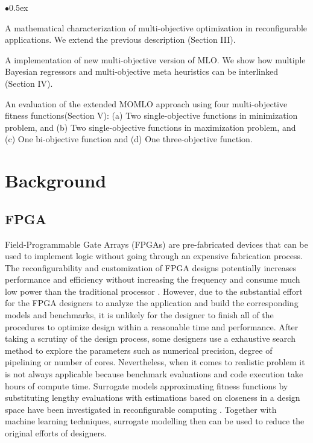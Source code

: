 \documentclass[11pt, runningheads,a4paper]{llncs}
\begin{document}
\vspace{-0.5em}

\begin{list}{$\bullet$}{\itemsep 0.5ex}

\item A mathematical characterization of multi-objective optimization in reconfigurable applications. We extend the previous description \cite{arc2012MLO} (Section III).

\item A implementation of new multi-objective version of MLO. We show how multiple Bayesian regressors and multi-objective meta heuristics can be interlinked (Section IV).

\item An evaluation of the extended MOMLO approach using four multi-objective fitness functions(Section V): (a) Two single-objective functions in minimization problem, and (b) Two single-objective functions in maximization problem, and (c) One bi-objective function  and (d) One three-objective function.
\end{list}




\section{Background}
\subsection{FPGA}
 Field-Programmable Gate Arrays (FPGAs) are pre-fabricated devices that can be used to implement logic without going through an expensive fabrication process. The reconfigurability and customization of FPGA designs potentially increases performance and efficiency without increasing the frequency and consume much low power than the traditional processor \cite{arc2012MLO}. However, due to the substantial effort for the FPGA designers to analyze the application and build the corresponding models and benchmarks, it is unlikely for the designer to finish all of the procedures to optimize design within a reasonable time and performance. 
After taking a scrutiny of the design process,  some designers use a exhaustive search method to explore the parameters such as numerical precision, degree of pipelining or number of cores. Nevertheless, when it comes to realistic problem it is not always applicable because benchmark evaluations and code execution take hours of compute time. Surrogate models approximating fitness functions by substituting lengthy evaluations with estimations based on closeness in a design space have been investigated in reconfigurable computing \cite{Pilato2008}. Together with machine learning techniques, surrogate modelling then can be used to reduce the original efforts of designers.
\end{document}
